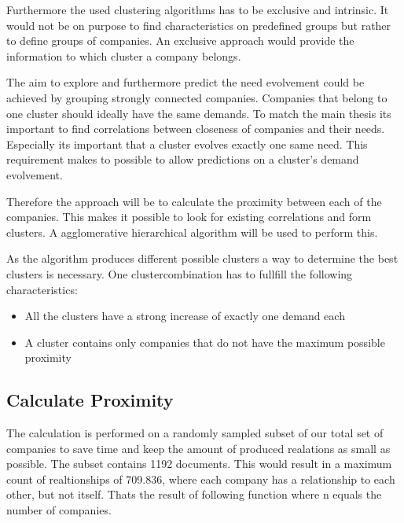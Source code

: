 Furthermore the used clustering algorithms has to be exclusive and intrinsic. It would not be on purpose to find
characteristics on predefined groups but rather to define groups of companies. An exclusive approach would provide
the information to which cluster a company belongs.

%

The aim to explore and furthermore predict the need evolvement could be achieved by grouping strongly connected companies.
Companies that belong to one cluster should ideally have the same demands. To match the main thesis its important to find
correlations between closeness of companies and their needs. Especially its important that a cluster evolves exactly one same
need. This requirement makes to possible to allow predictions on a cluster's demand evolvement.

Therefore the approach will be to calculate the proximity between each of the companies. This makes it possible to
look for existing correlations and form clusters. A agglomerative hierarchical algorithm will be used to perform this.

As the algorithm produces different possible clusters a way to determine the best clusters is necessary. One clustercombination
has to fullfill the following characteristics:
\begin{itemize}
  \item All the clusters have a strong increase of exactly one demand each
  \item A cluster contains only companies that do not have the maximum possible proximity
\end{itemize}


\subsection{Calculate Proximity}
The calculation is performed on a randomly sampled subset of our total set of companies to save time and keep the amount
of produced realations as small as possible. The subset contains 1192 documents. This would result in a maximum count of
realtionships of 709.836, where each company has a relationship to each other, but not itself. Thats the result of following
function where n equals the number of companies.

